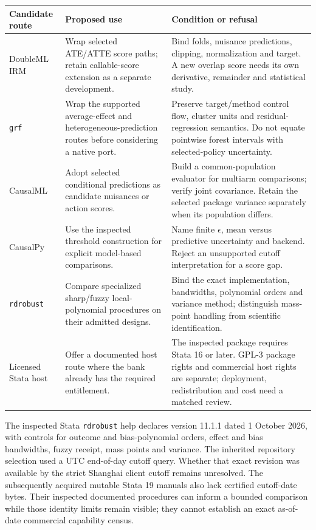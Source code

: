 \begin{longtable}{p{}p{}p{}}
\toprule
Candidate route&Proposed use&Condition or refusal\\ \midrule
DoubleML IRM&Wrap selected ATE/ATTE score paths; retain callable-score extension
as a separate development.&Bind folds, nuisance predictions, clipping,
normalization and target. A new overlap score needs its own derivative,
remainder and statistical study.\\
\texttt{grf}&Wrap the supported average-effect and heterogeneous-prediction
routes before considering a native port.&Preserve target/method control flow,
cluster units and residual-regression semantics. Do not equate pointwise
forest intervals with selected-policy uncertainty.\\
CausalML&Adopt selected conditional predictions as candidate nuisances or
action scores.&Build a common-population evaluator for multiarm comparisons;
verify joint covariance. Retain the selected package variance separately when
its population differs.\\
CausalPy&Use the inspected threshold construction for explicit model-based
comparisons.&Name finite $\epsilon$, mean versus predictive uncertainty and
backend. Reject an unsupported cutoff interpretation for a score gap.\\
\texttt{rdrobust}&Compare specialized sharp/fuzzy local-polynomial procedures
on their admitted designs.&Bind the exact implementation, bandwidths,
polynomial orders and variance method; distinguish mass-point handling from
scientific identification.\\
Licensed Stata host&Offer a documented host route where the bank already has
the required entitlement.&The inspected package requires Stata 16 or later.
GPL-3 package rights and commercial host rights are separate; deployment,
redistribution and cost need a matched review.\\ \bottomrule
\end{longtable}

The inspected Stata \texttt{rdrobust} help declares version 11.1.1 dated
1 October 2026, with controls for outcome and bias-polynomial orders, effect
and bias bandwidths, fuzzy receipt, mass points and variance. The inherited
repository selection used a UTC end-of-day cutoff query. Whether that exact
revision was available by the strict Shanghai client cutoff remains unresolved.
The subsequently acquired mutable Stata 19 manuals also lack certified
cutoff-date bytes. Their inspected documented procedures can inform a bounded
comparison while those identity limits remain visible; they cannot establish
an exact as-of-date commercial capability census.~\citep{exec13_ivrd_rdrobust,exec13_ivrd_stata}

